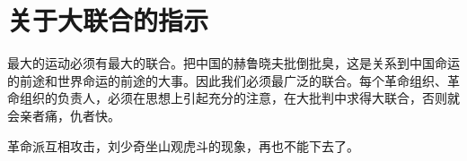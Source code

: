 \section[关于大联合的指示（一九六七年八月）]{关于大联合的指示}


最大的运动必须有最大的联合。把中国的赫鲁晓夫批倒批臭，这是关系到中国命运的前途和世界命运的前途的大事。因此我们必须最广泛的联合。每个革命组织、革命组织的负责人，必须在思想上引起充分的注意，在大批判中求得大联合，否则就会亲者痛，仇者快。

革命派互相攻击，刘少奇坐山观虎斗的现象，再也不能下去了。


